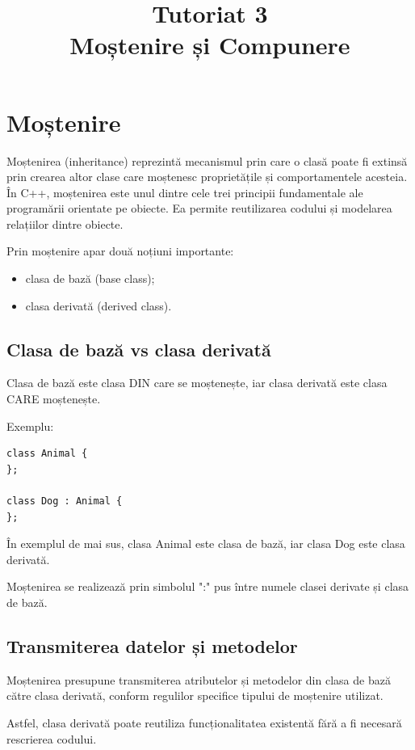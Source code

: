 \documentclass[12pt,a4paper]{article}
\title{Tutoriat 3\\Moștenire și Compunere}
\author{}
\date{}
\begin{document}
\maketitle

\section{Moștenire}

Moștenirea (inheritance) reprezintă mecanismul prin care o clasă poate fi extinsă prin crearea altor clase care moștenesc proprietățile și comportamentele acesteia. În C++, moștenirea este unul dintre cele trei principii fundamentale ale programării orientate pe obiecte. Ea permite reutilizarea codului și modelarea relațiilor dintre obiecte.

Prin moștenire apar două noțiuni importante:

\begin{itemize}
\item clasa de bază (base class);
\item clasa derivată (derived class).
\end{itemize}

\subsection{Clasa de bază vs clasa derivată}

Clasa de bază este clasa DIN care se moștenește, iar clasa derivată este clasa CARE moștenește.

Exemplu:

\begin{verbatim}
class Animal {
};

class Dog : Animal {
};
\end{verbatim}

În exemplul de mai sus, clasa Animal este clasa de bază, iar clasa Dog este clasa derivată.

Moștenirea se realizează prin simbolul ":" pus între numele clasei derivate și clasa de bază.

\subsection{Transmiterea datelor și metodelor}

Moștenirea presupune transmiterea atributelor și metodelor din clasa de bază către clasa derivată, conform regulilor specifice tipului de moștenire utilizat.

Astfel, clasa derivată poate reutiliza funcționalitatea existentă fără a fi necesară rescrierea codului.
\end{document}
